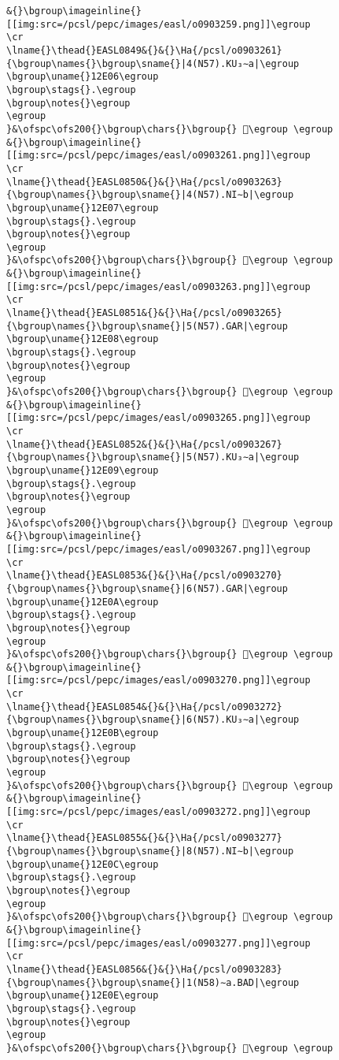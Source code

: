 \begin{verbatim}
&{}\bgroup\imageinline{}[[img:src=/pcsl/pepc/images/easl/o0903259.png]]\egroup
\cr
\lname{}\thead{}EASL0849&{}&{}\Ha{/pcsl/o0903261}{\bgroup\names{}\bgroup\sname{}|4(N57).KU₃∼a|\egroup
\bgroup\uname{}12E06\egroup
\bgroup\stags{}.\egroup
\bgroup\notes{}\egroup
\egroup
}&\ofspc\ofs200{}\bgroup\chars{}\bgroup{} 𒸆\egroup \egroup
&{}\bgroup\imageinline{}[[img:src=/pcsl/pepc/images/easl/o0903261.png]]\egroup
\cr
\lname{}\thead{}EASL0850&{}&{}\Ha{/pcsl/o0903263}{\bgroup\names{}\bgroup\sname{}|4(N57).NI∼b|\egroup
\bgroup\uname{}12E07\egroup
\bgroup\stags{}.\egroup
\bgroup\notes{}\egroup
\egroup
}&\ofspc\ofs200{}\bgroup\chars{}\bgroup{} 𒸇\egroup \egroup
&{}\bgroup\imageinline{}[[img:src=/pcsl/pepc/images/easl/o0903263.png]]\egroup
\cr
\lname{}\thead{}EASL0851&{}&{}\Ha{/pcsl/o0903265}{\bgroup\names{}\bgroup\sname{}|5(N57).GAR|\egroup
\bgroup\uname{}12E08\egroup
\bgroup\stags{}.\egroup
\bgroup\notes{}\egroup
\egroup
}&\ofspc\ofs200{}\bgroup\chars{}\bgroup{} 𒸈\egroup \egroup
&{}\bgroup\imageinline{}[[img:src=/pcsl/pepc/images/easl/o0903265.png]]\egroup
\cr
\lname{}\thead{}EASL0852&{}&{}\Ha{/pcsl/o0903267}{\bgroup\names{}\bgroup\sname{}|5(N57).KU₃∼a|\egroup
\bgroup\uname{}12E09\egroup
\bgroup\stags{}.\egroup
\bgroup\notes{}\egroup
\egroup
}&\ofspc\ofs200{}\bgroup\chars{}\bgroup{} 𒸉\egroup \egroup
&{}\bgroup\imageinline{}[[img:src=/pcsl/pepc/images/easl/o0903267.png]]\egroup
\cr
\lname{}\thead{}EASL0853&{}&{}\Ha{/pcsl/o0903270}{\bgroup\names{}\bgroup\sname{}|6(N57).GAR|\egroup
\bgroup\uname{}12E0A\egroup
\bgroup\stags{}.\egroup
\bgroup\notes{}\egroup
\egroup
}&\ofspc\ofs200{}\bgroup\chars{}\bgroup{} 𒸊\egroup \egroup
&{}\bgroup\imageinline{}[[img:src=/pcsl/pepc/images/easl/o0903270.png]]\egroup
\cr
\lname{}\thead{}EASL0854&{}&{}\Ha{/pcsl/o0903272}{\bgroup\names{}\bgroup\sname{}|6(N57).KU₃∼a|\egroup
\bgroup\uname{}12E0B\egroup
\bgroup\stags{}.\egroup
\bgroup\notes{}\egroup
\egroup
}&\ofspc\ofs200{}\bgroup\chars{}\bgroup{} 𒸋\egroup \egroup
&{}\bgroup\imageinline{}[[img:src=/pcsl/pepc/images/easl/o0903272.png]]\egroup
\cr
\lname{}\thead{}EASL0855&{}&{}\Ha{/pcsl/o0903277}{\bgroup\names{}\bgroup\sname{}|8(N57).NI∼b|\egroup
\bgroup\uname{}12E0C\egroup
\bgroup\stags{}.\egroup
\bgroup\notes{}\egroup
\egroup
}&\ofspc\ofs200{}\bgroup\chars{}\bgroup{} 𒸌\egroup \egroup
&{}\bgroup\imageinline{}[[img:src=/pcsl/pepc/images/easl/o0903277.png]]\egroup
\cr
\lname{}\thead{}EASL0856&{}&{}\Ha{/pcsl/o0903283}{\bgroup\names{}\bgroup\sname{}|1(N58)∼a.BAD|\egroup
\bgroup\uname{}12E0E\egroup
\bgroup\stags{}.\egroup
\bgroup\notes{}\egroup
\egroup
}&\ofspc\ofs200{}\bgroup\chars{}\bgroup{} 𒸎\egroup \egroup

\end{verbatim}
